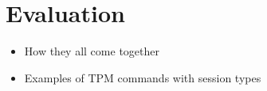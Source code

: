 \section{Evaluation}
\begin{itemize}
  \item How they all come together
  \item Examples of TPM commands with session types
\end{itemize}